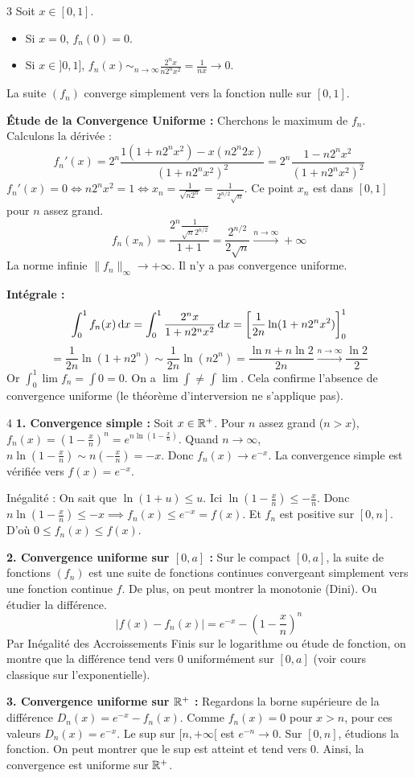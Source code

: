 \begin{correction}{3}
Soit $x \in [0, 1]$.
\begin{itemize}
    \item Si $x = 0$, $f_n(0) = 0$.
    \item Si $x \in ]0, 1]$, $f_n(x) \sim_{n\to\infty} \frac{2^n x}{n 2^n x^2} = \frac{1}{nx} \to 0$.
\end{itemize}
La suite $(f_n)$ converge simplement vers la fonction nulle sur $[0, 1]$.

\textbf{Étude de la Convergence Uniforme :}
Cherchons le maximum de $f_n$. Calculons la dérivée :
$$ f_n'(x) = 2^n \frac{1(1+n 2^n x^2) - x(n 2^n 2x)}{(1+n 2^n x^2)^2} = 2^n \frac{1 - n 2^n x^2}{(1+n 2^n x^2)^2} $$
$f_n'(x) = 0 \iff n 2^n x^2 = 1 \iff x_n = \frac{1}{\sqrt{n 2^n}} = \frac{1}{2^{n/2}\sqrt{n}}$.
Ce point $x_n$ est dans $[0, 1]$ pour $n$ assez grand.
$$ f_n(x_n) = \frac{2^n \frac{1}{\sqrt{n} 2^{n/2}}}{1+1} = \frac{2^{n/2}}{2\sqrt{n}} \xrightarrow{n\to\infty} +\infty $$
La norme infinie $\|f_n\|_\infty \to +\infty$. Il n'y a pas convergence uniforme.

\textbf{Intégrale :}
$$ \int_0^1 f_n(x) \,\mathrm{d}x = \int_0^1 \frac{2^n x}{1+n 2^n x^2} \,\mathrm{d}x = \left[ \frac{1}{2n} \ln(1+n 2^n x^2) \right]_0^1 $$
$$ = \frac{1}{2n} \ln(1+n 2^n) \sim \frac{1}{2n} \ln(n 2^n) = \frac{\ln n + n \ln 2}{2n} \xrightarrow{n\to\infty} \frac{\ln 2}{2} $$
Or $\int_0^1 \lim f_n = \int 0 = 0$.
On a $\lim \int \neq \int \lim$. Cela confirme l'absence de convergence uniforme (le théorème d'interversion ne s'applique pas).
\end{correction}

\begin{correction}{4}
\textbf{1. Convergence simple :}
Soit $x \in \mathbb{R}^+$. Pour $n$ assez grand ($n>x$), $f_n(x) = (1-\frac{x}{n})^n = e^{n \ln(1-\frac{x}{n})}$.
Quand $n \to \infty$, $n \ln(1-\frac{x}{n}) \sim n(-\frac{x}{n}) = -x$.
Donc $f_n(x) \to e^{-x}$. La convergence simple est vérifiée vers $f(x) = e^{-x}$.

Inégalité : On sait que $\ln(1+u) \le u$. Ici $\ln(1-\frac{x}{n}) \le -\frac{x}{n}$.
Donc $n \ln(1-\frac{x}{n}) \le -x \implies f_n(x) \le e^{-x} = f(x)$.
Et $f_n$ est positive sur $[0, n]$. D'où $0 \le f_n(x) \le f(x)$.

\textbf{2. Convergence uniforme sur $[0, a]$ :}
Sur le compact $[0, a]$, la suite de fonctions $(f_n)$ est une suite de fonctions continues convergeant simplement vers une fonction continue $f$.
De plus, on peut montrer la monotonie (Dini). Ou étudier la différence.
$$ |f(x) - f_n(x)| = e^{-x} - (1-\frac{x}{n})^n $$
Par Inégalité des Accroissements Finis sur le logarithme ou étude de fonction, on montre que la différence tend vers 0 uniformément sur $[0, a]$ (voir cours classique sur l'exponentielle).

\textbf{3. Convergence uniforme sur $\mathbb{R}^+$ :}
Regardons la borne supérieure de la différence $D_n(x) = e^{-x} - f_n(x)$.
Comme $f_n(x) = 0$ pour $x > n$, pour ces valeurs $D_n(x) = e^{-x}$.
Le sup sur $[n, +\infty[$ est $e^{-n} \to 0$.
Sur $[0, n]$, étudions la fonction. On peut montrer que le sup est atteint et tend vers 0.
Ainsi, la convergence est uniforme sur $\mathbb{R}^+$.
\end{correction}

